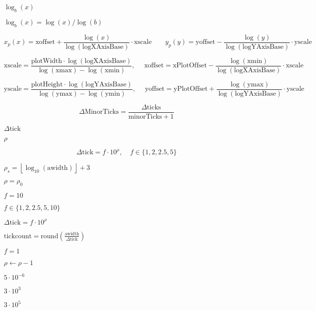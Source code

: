 \documentclass{article}
\begin{document}
$ \log_b(x) $
\pagebreak

$ \log_b(x)=\log(x)/\log(b) $
\pagebreak

\[ x_p(x)=\mbox{xoffset}+\frac{\log(x)}{\log(\mbox{logXAxisBase})}\cdot\mbox{xscale} \ \ \ \ \ \ \ \ \ y_p(y)=\mbox{yoffset}-\frac{\log(y)}{\log(\mbox{logYAxisBase})}\cdot\mbox{yscale} \]
\pagebreak

\[ \mbox{xscale}=\frac{\mbox{plotWidth}\cdot\log(\mbox{logXAxisBase})}{\log(\mbox{xmax})-\log(\mbox{xmin})},\ \ \ \ \ \ \mbox{xoffset}=\mbox{xPlotOffset}-\frac{\log(\mbox{xmin})}{\log(\mbox{logXAxisBase})}\cdot\mbox{xscale} \]
\pagebreak

\[ \mbox{yscale}=\frac{\mbox{plotHeight}\cdot\log(\mbox{logYAxisBase})}{\log(\mbox{ymax})-\log(\mbox{ymin})},\ \ \ \ \ \ \mbox{yoffset}=\mbox{yPlotOffset}+\frac{\log(\mbox{ymax})}{\log(\mbox{logYAxisBase})}\cdot\mbox{yscale} \]
\pagebreak

\[ \Delta\mbox{MinorTicks}=\frac{\Delta\mbox{ticks}}{\mbox{minorTicks}+1} \]
\pagebreak

$ \Delta\mbox{tick} $
\pagebreak

$ \rho $
\pagebreak

\[ \Delta\mbox{tick}=f\cdot 10^\rho,\ \ \ \ \ f\in\{1, 2, 2.5, 5\} \]
\pagebreak

$ \rho_s=\left\lfloor\log_{10}(\mbox{awidth})\right\rfloor+3 $
\pagebreak

$ \rho=\rho_0 $
\pagebreak

$ f=10 $
\pagebreak

$ f\in\{1, 2, 2.5, 5, 10\} $
\pagebreak

$ \Delta\mbox{tick}=f\cdot 10^\rho $
\pagebreak

$ \mbox{tickcount}=\mbox{round}\left(\frac{\mbox{awidth}}{\Delta\mbox{tick}}\right) $
\pagebreak

$ f=1 $
\pagebreak

$ \rho \leftarrow \rho-1 $
\pagebreak

$ 5\cdot 10^{-6} $
\pagebreak

$ 3\cdot 10^3 $
\pagebreak

$ 3\cdot 10^5 $
\pagebreak
\end{document}
